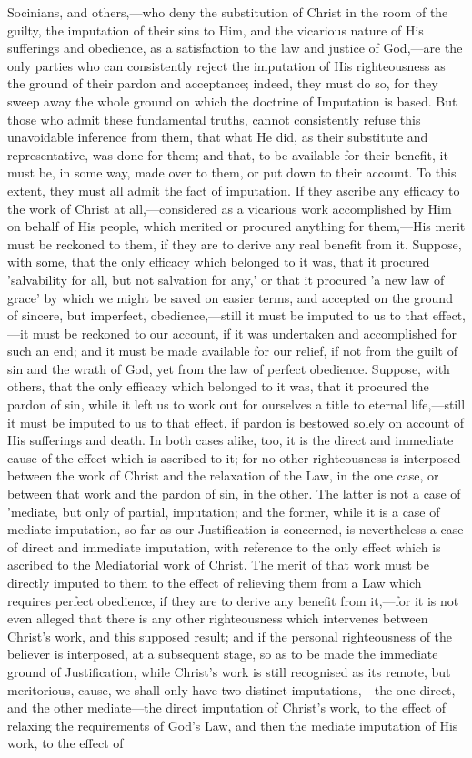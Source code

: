 \documentclass[
]{book}
\begin{document}
Socinians, and others,---who deny the substitution of Christ in the room of the guilty, the imputation of their sins to Him, and the vicarious nature of His sufferings and obedience, as a satisfaction to the law and justice of God,---are the only parties who can consistently reject the imputation of His righteousness as the ground of their pardon and acceptance; indeed, they must do so, for they sweep away the whole ground on which the doctrine of Imputation is based. But those who admit these fundamental truths, cannot consistently refuse this unavoidable inference from them, that what He did, as their substitute and representative, was done for them; and that, to be available for their benefit, it must be, in some way, made over to them, or put down to their account. To this extent, they must all admit the fact of imputation. If they ascribe any efficacy to the work of Christ at all,---considered as a vicarious work accomplished by Him on behalf of His people, which merited or procured anything for them,---His merit must be reckoned to them, if they are to derive any real benefit from it. Suppose, with some, that the only efficacy which belonged to it was, that it procured 'salvability for all, but not salvation for any,' or that it procured 'a new law of grace' by which we might be saved on easier terms, and accepted on the ground of sincere, but imperfect, obedience,---still it must be imputed to us to that effect,---it must be reckoned to our account, if it was undertaken and accomplished for such an end; and it must be made available for our relief, if not from the guilt of sin and the wrath of God, yet from the law of perfect obedience. Suppose, with others, that the only efficacy which belonged to it was, that it procured the pardon of sin, while it left us to work out for ourselves a title to eternal life,---still it must be imputed to us to that effect, if pardon is bestowed solely on account of His sufferings and death. In both cases alike, too, it is the direct and immediate cause of the effect which is ascribed to it; for no other righteousness is interposed between the work of Christ and the relaxation of the Law, in the one case, or between that work and the pardon of sin, in the other. The latter is not a case of 'mediate, but only of partial, imputation; and the former, while it is a case of mediate imputation, so far as our Justification is concerned, is nevertheless a case of direct and immediate imputation, with reference to the only effect which is ascribed to the Mediatorial work of Christ. The merit of that work must be directly imputed to them to the effect of relieving them from a Law which requires perfect obedience, if they are to derive any benefit from it,---for it is not even alleged that there is any other righteousness which intervenes between Christ's work, and this supposed result; and if the personal righteousness of the believer is interposed, at a subsequent stage, so as to be made the immediate ground of Justification, while Christ's work is still recognised as its remote, but meritorious, cause, we shall only have two distinct imputations,---the one direct, and the other mediate---the direct imputation of Christ's work, to the effect of relaxing the requirements of God's Law, and then the mediate imputation of His work, to the effect of 
\end{document}

